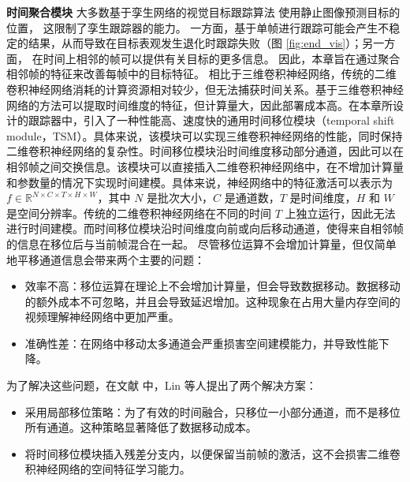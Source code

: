 \textbf{时间聚合模块}
大多数基于孪生网络的视觉目标跟踪算法 \cite{SiamRPN++, Wang2018SiamMask} 使用静止图像预测目标的位置，%
这限制了孪生跟踪器的能力。
一方面，基于单帧进行跟踪可能会产生不稳定的结果，从而导致在目标表观发生退化时跟踪失败（图 \ref{fig:end_vis}）；另一方面，
在时间上相邻的帧可以提供有关目标的更多信息。
因此，本章旨在通过聚合相邻帧的特征来改善每帧中的目标特征。
相比于三维卷积神经网络，传统的二维卷积神经网络消耗的计算资源相对较少，但无法捕获时间关系。基于三维卷积神经网络的方法可以提取时间维度的特征，但计算量大，因此部署成本高。在本章所设计的跟踪器中，引入了一种性能高、速度快的通用时间移位模块（temporal shift module，TSM）\cite{lin2019tsm}。具体来说，该模块可以实现三维卷积神经网络的性能，同时保持二维卷积神经网络的复杂性。时间移位模块沿时间维度移动部分通道，因此可以在相邻帧之间交换信息。该模块可以直接插入二维卷积神经网络中，在不增加计算量和参数量的情况下实现时间建模。具体来说，神经网络中的特征激活可以表示为 $f \in \mathbb R^{N\times C\times T\times H\times W}$，其中 $N$ 是批次大小，$C$ 是通道数，$T$ 是时间维度，$H$ 和 $W$ 是空间分辨率。传统的二维卷积神经网络在不同的时间 $T$ 上独立运行，因此无法进行时间建模。而时间移位模块沿时间维度向前或向后移动通道，使得来自相邻帧的信息在移位后与当前帧混合在一起。
尽管移位运算不会增加计算量，但仅简单地平移通道信息会带来两个主要的问题：
\begin{itemize}
\item 效率不高：移位运算在理论上不会增加计算量，但会导致数据移动。数据移动的额外成本不可忽略，并且会导致延迟增加。这种现象在占用大量内存空间的视频理解神经网络中更加严重。
\item 准确性差：在网络中移动太多通道会严重损害空间建模能力，并导致性能下降。
\end{itemize}

为了解决这些问题，在文献 \cite{lin2019tsm} 中，Lin 等人提出了两个解决方案：
\begin{itemize}
\item 采用局部移位策略：为了有效的时间融合，只移位一小部分通道，而不是移位所有通道。这种策略显著降低了数据移动成本。
\item 将时间移位模块插入残差分支内，以便保留当前帧的激活，这不会损害二维卷积神经网络的空间特征学习能力。
\end{itemize}

